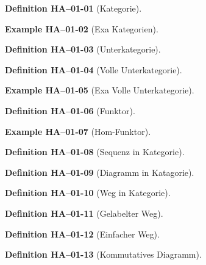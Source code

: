 \documentclass[10pt, letterpaper]{article}
\newcommand{\CustomHeading}[3]{%
  \par\medskip\noindent%
  \textbf{#1 #2} \textnormal{(#3)}.\enskip%
}
\newenvironment{DEF}[2]{\CustomHeading{Definition}{#1}{#2}}{}
\newenvironment{EXA}[2]{\CustomHeading{Example}{#1}{#2}}{}
\begin{document}
\begin{DEF}{HA--01-01}{Kategorie}
\end{DEF}

\begin{EXA}{HA--01-02}{Exa Kategorien}
\end{EXA}

\begin{DEF}{HA--01-03}{Unterkategorie}
\end{DEF}

\begin{DEF}{HA--01-04}{Volle Unterkategorie}
\end{DEF}

\begin{EXA}{HA--01-05}{Exa Volle Unterkategorie}
\end{EXA}

\begin{DEF}{HA--01-06}{Funktor}
\end{DEF}

\begin{EXA}{HA--01-07}{Hom-Funktor}
\end{EXA}

\begin{DEF}{HA--01-08}{Sequenz in Kategorie}
\end{DEF}

\begin{DEF}{HA--01-09}{Diagramm in Katagorie}
\end{DEF}

\begin{DEF}{HA--01-10}{Weg in Kategorie}
\end{DEF}

\begin{DEF}{HA--01-11}{Gelabelter Weg}
\end{DEF}

\begin{DEF}{HA--01-12}{Einfacher Weg}
\end{DEF}

\begin{DEF}{HA--01-13}{Kommutatives Diagramm}
\end{DEF}
\end{document}
